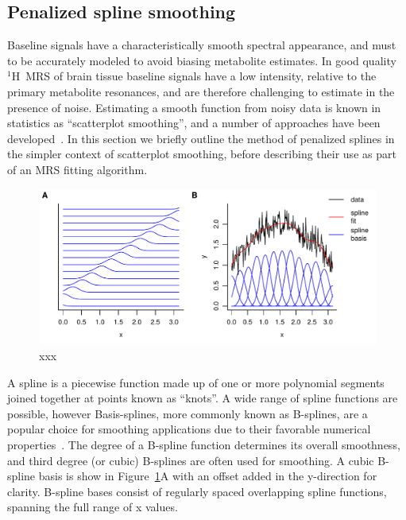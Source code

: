 \documentclass[num-refs]{wiley-article}
\newcommand{\proton}{\ensuremath{^1\mathrm{H}}}
\begin{document}
\subsection{Penalized spline smoothing}

Baseline signals have a characteristically smooth spectral appearance, and must to be accurately modeled to avoid biasing metabolite estimates. In good quality \proton\ MRS of brain tissue baseline signals have a low intensity, relative to the primary metabolite resonances, and are therefore challenging to estimate in the presence of noise. Estimating a smooth function from noisy data is known in statistics as ``scatterplot smoothing'', and a number of approaches have been developed~\cite{Ruppert2003}. In this section we briefly outline the method of penalized splines in the simpler context of scatterplot smoothing, before describing their use as part of an MRS fitting algorithm.

\begin{figure}
  \begin{center}
    \includegraphics[width=1\textwidth]{fig1.pdf}
    \caption{xxx}
    \label{bspline_regression}
  \end{center}
\end{figure}

A spline is a piecewise function made up of one or more polynomial segments joined together at points known as ``knots''. A wide range of spline functions are possible, however Basis-splines, more commonly known as B-splines, are a popular choice for smoothing applications due to their favorable numerical properties~\cite{DeBoor2001}. The degree of a B-spline function determines its overall smoothness, and third degree (or cubic) B-splines are often used for smoothing. A cubic B-spline basis is show in Figure~\ref{bspline_regression}A with an offset added in the y-direction for clarity. B-spline bases consist of regularly spaced overlapping spline functions, spanning the full range of x values.
\end{document}

